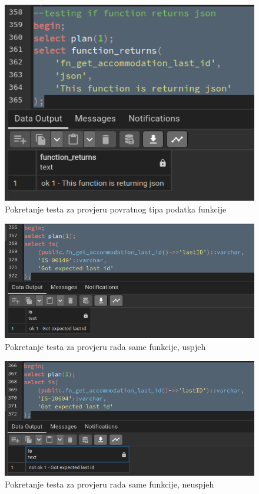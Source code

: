 				\begin{figure}[H]
					\centering
					\includegraphics[width=\textwidth]{slike/unit_tests/ut_6/func_return.png}
					\caption{Pokretanje testa za provjeru povratnog tipa podatka funkcije}
					\label{fig: IS6-function_return}
				\end{figure}
				\begin{figure}[H]
					\centering
					\includegraphics[width=\textwidth]{slike/unit_tests/ut_6/success_invocation.png}
					\caption{Pokretanje testa za provjeru rada same funkcije, uspjeh}
					\label{fig: IS6-uspješno dohvaćen posljednji realestateid}
				\end{figure}
				\begin{figure}[H]
					\centering
					\includegraphics[width=\textwidth]{slike/unit_tests/ut_6/failure_invocation.png}
					\caption{Pokretanje testa za provjeru rada same funkcije, neuspjeh}
					\label{fig: IS6-navedeni realestateid ne postoji}
				\end{figure}
